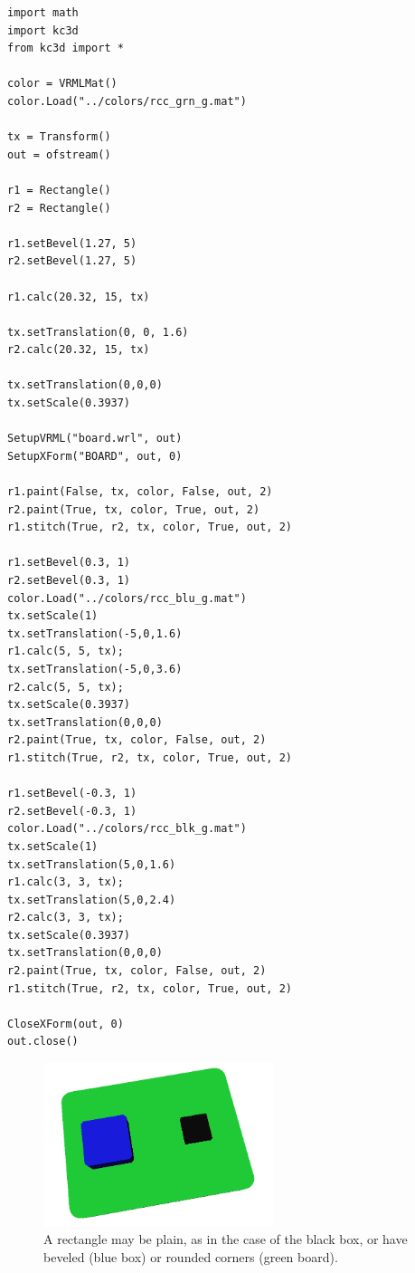 \begin{verbatim}
import math
import kc3d
from kc3d import *

color = VRMLMat()
color.Load("../colors/rcc_grn_g.mat")

tx = Transform()
out = ofstream()

r1 = Rectangle()
r2 = Rectangle()

r1.setBevel(1.27, 5)
r2.setBevel(1.27, 5)

r1.calc(20.32, 15, tx)

tx.setTranslation(0, 0, 1.6)
r2.calc(20.32, 15, tx)

tx.setTranslation(0,0,0)
tx.setScale(0.3937)

SetupVRML("board.wrl", out)
SetupXForm("BOARD", out, 0)

r1.paint(False, tx, color, False, out, 2)
r2.paint(True, tx, color, True, out, 2)
r1.stitch(True, r2, tx, color, True, out, 2)

r1.setBevel(0.3, 1) 
r2.setBevel(0.3, 1) 
color.Load("../colors/rcc_blu_g.mat")
tx.setScale(1)
tx.setTranslation(-5,0,1.6)
r1.calc(5, 5, tx);
tx.setTranslation(-5,0,3.6)
r2.calc(5, 5, tx);
tx.setScale(0.3937)
tx.setTranslation(0,0,0)
r2.paint(True, tx, color, False, out, 2)
r1.stitch(True, r2, tx, color, True, out, 2)

r1.setBevel(-0.3, 1) 
r2.setBevel(-0.3, 1) 
color.Load("../colors/rcc_blk_g.mat")
tx.setScale(1)
tx.setTranslation(5,0,1.6)
r1.calc(3, 3, tx);
tx.setTranslation(5,0,2.4)
r2.calc(3, 3, tx);
tx.setScale(0.3937)
tx.setTranslation(0,0,0)
r2.paint(True, tx, color, False, out, 2)
r1.stitch(True, r2, tx, color, True, out, 2)

CloseXForm(out, 0)
out.close()
\end{verbatim}

\begin{figure}
\label{fig:k3dtools-board}
\centering
\includegraphics[width = 0.6\textwidth]{img/k3dtools-board.png}
\caption{A rectangle may be plain, as in the case of the black box, or have beveled (blue box)
or rounded corners (green board).}
\end{figure}


